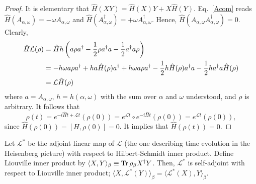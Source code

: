 \begin{proof}
It is elementary that $\hat H(XY) = \hat H(X) Y + X \hat H (Y)$.
Eq.~\eqref{Acom} reads $\hat H (A_{\alpha,\omega}) = -\omega A_{\alpha,\omega}$
and $\hat H (A_{\alpha,\omega}^\dagger) = +\omega A_{\alpha,\omega}^\dagger$.
Hence, $\hat H (A_{\alpha,\omega} A_{\alpha,\omega}^\dagger) = 0$.
Clearly,
\begin{align*}
\hat H \mathcal L (\rho) 
&= \hat H h \left( a \rho a^\dagger - \frac{1}{2} \rho a^\dagger a - \frac{1}{2} a^\dagger a \rho \right) \\
&= -h\omega a \rho a^\dagger + ha \hat H (\rho) a^\dagger + h\omega a \rho a^\dagger 
   - \frac{1}{2} h \hat H (\rho) a^\dagger a 
   - \frac{1}{2} h a^\dagger a \hat H(\rho) \\
&= \mathcal L \hat H (\rho)
\end{align*}
where $a = A_{\alpha,\omega}$, $h=h(\alpha,\omega)$ with the sum over $\alpha$ and $\omega$ understood,
and $\rho$ is arbitrary.
It follows that
\[
\rho(t)=e^{-i\hat{H} t + \mathcal L t}(\rho(0)) =e^{\mathcal L t} \circ  e^{-i\hat{H} t} (\rho(0))= e^{\mathcal L t}(\rho(0)),
\]
since $\hat H(\rho(0)) = [H,\rho(0)]=0$. It implies that $\hat H(\rho(t)) = 0$.
\end{proof}
\begin{prop}
Let $\mathcal L^*$ be the adjoint linear map of $\mathcal L$
(the one describing time evolution in the Heisenberg picture)
with respect to Hilbert-Schmidt inner product.
Define Liouville inner product by $\langle X,Y \rangle_\beta \equiv \mathop{\mathrm{Tr}}\nolimits{\rho_\beta X^\dag Y}$.
Then, $\mathcal L^*$ is self-adjoint with respect to Liouville inner product; 
$\langle X, \mathcal L^*(Y) \rangle_\beta = \langle \mathcal L^*(X), Y \rangle_\beta$.
\label{prop:L-Liouville-hermitian}
\end{prop}
